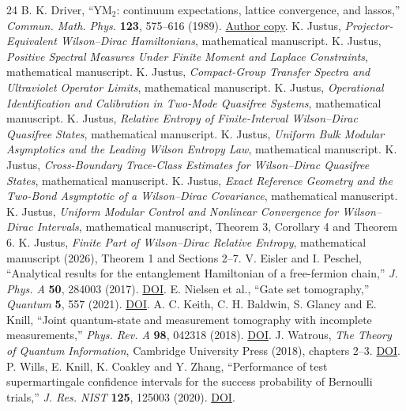 \documentclass[11pt,letterpaper]{article}
\begin{document}
\begin{thebibliography}{24}
 B. K. Driver, “YM$_2$: continuum expectations, lattice convergence, and lassos,” \textit{Commun. Math. Phys.} \textbf{123}, 575–616 (1989). \href{https://mathweb.ucsd.edu/~bdriver/DRIVER/Papers/Drivers_Papers/A3-YM2-Expectations.pdf}{Author copy}.
 K. Justus, \textit{Projector-Equivalent Wilson–Dirac Hamiltonians}, mathematical manuscript.
 K. Justus, \textit{Positive Spectral Measures Under Finite Moment and Laplace Constraints}, mathematical manuscript.
 K. Justus, \textit{Compact-Group Transfer Spectra and Ultraviolet Operator Limits}, mathematical manuscript.
 K. Justus, \textit{Operational Identification and Calibration in Two-Mode Quasifree Systems}, mathematical manuscript.
 K. Justus, \textit{Relative Entropy of Finite-Interval Wilson–Dirac Quasifree States}, mathematical manuscript.
 K. Justus, \textit{Uniform Bulk Modular Asymptotics and the Leading Wilson Entropy Law}, mathematical manuscript.
 K. Justus, \textit{Cross-Boundary Trace-Class Estimates for Wilson–Dirac Quasifree States}, mathematical manuscript.
 K. Justus, \textit{Exact Reference Geometry and the Two-Bond Asymptotic of a Wilson–Dirac Covariance}, mathematical manuscript.
 K. Justus, \textit{Uniform Modular Control and Nonlinear Convergence for Wilson–Dirac Intervals}, mathematical manuscript, Theorem 3, Corollary 4 and Theorem 6.
 K. Justus, \textit{Finite Part of Wilson–Dirac Relative Entropy}, mathematical manuscript (2026), Theorem 1 and Sections 2–7.
 V. Eisler and I. Peschel, “Analytical results for the entanglement Hamiltonian of a free-fermion chain,” \textit{J. Phys. A} \textbf{50}, 284003 (2017). \href{https://doi.org/10.1088/1751-8121/aa76b5}{DOI}.
 E. Nielsen et al., “Gate set tomography,” \textit{Quantum} \textbf{5}, 557 (2021). \href{https://doi.org/10.22331/q-2021-10-05-557}{DOI}.
 A. C. Keith, C. H. Baldwin, S. Glancy and E. Knill, “Joint quantum-state and measurement tomography with incomplete measurements,” \textit{Phys. Rev. A} \textbf{98}, 042318 (2018). \href{https://doi.org/10.1103/PhysRevA.98.042318}{DOI}.
 J. Watrous, \textit{The Theory of Quantum Information}, Cambridge University Press (2018), chapters 2–3. \href{https://doi.org/10.1017/9781316848142}{DOI}.
 P. Wills, E. Knill, K. Coakley and Y. Zhang, “Performance of test supermartingale confidence intervals for the success probability of Bernoulli trials,” \textit{J. Res. NIST} \textbf{125}, 125003 (2020). \href{https://doi.org/10.6028/jres.125.003}{DOI}.

\end{thebibliography}
\end{document}
